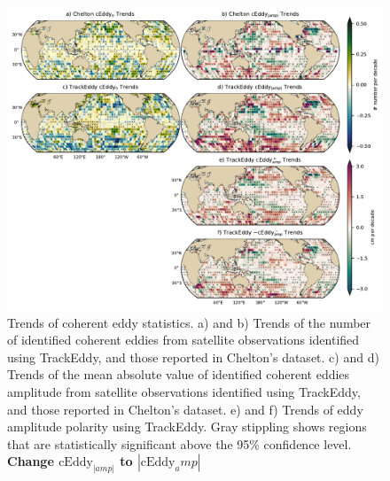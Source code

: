 \documentclass[draft,linenumbers]{agujournal2019}
\newcommand{\cEddy}{\textrm{cEddy}}
\begin{document}
	\begin{figure}
	    \centering
	    \includegraphics[width=1\textwidth]{figures/all_trackeddy_trends_all.pdf}
	    \caption{Trends of coherent eddy statistics. a) and b) Trends of the number of identified coherent eddies from satellite observations identified using TrackEddy, and those reported in Chelton's dataset. c) and d) Trends of the mean absolute value of identified coherent eddies amplitude from satellite observations identified using TrackEddy, and those reported in Chelton's dataset. e) and f) Trends of eddy amplitude polarity using TrackEddy. Gray stippling shows regions that are statistically significant above the 95\% confidence level.
		\textbf{Change $\cEddy_{|amp|}$ to $|\cEddy_amp|$}
		}
	    \label{fig:eddy_stats_trends}
	\end{figure}


	
\end{document}

